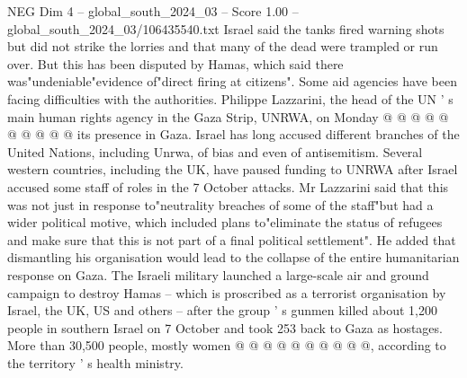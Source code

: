 \begin{textsample}{NEG Dim 4 – global\_south\_2024\_03 – Score 1.00 – global\_south\_2024\_03/106435540.txt}
Israel said the tanks fired warning shots but did not strike the lorries and that many of the dead were trampled or run over.
But this has been disputed by Hamas, which said there was"undeniable"evidence of"direct firing at citizens".
Some aid agencies have been facing difficulties with the authorities.
Philippe Lazzarini, the head of the UN ' s main human rights agency in the Gaza Strip, UNRWA, on Monday @ @ @ @ @ @ @ @ @ @ its presence in Gaza.
Israel has long accused different branches of the United Nations, including Unrwa, of bias and even of antisemitism.
Several western countries, including the UK, have paused funding to UNRWA after Israel accused some staff of roles in the 7 October attacks.
Mr Lazzarini said that this was not just in response to"neutrality breaches of some of the staff"but had a wider political motive, which included plans to"eliminate the status of refugees and make sure that this is not part of a final political settlement".
He added that dismantling his organisation would lead to the collapse of the entire humanitarian response on Gaza.
The Israeli military launched a large-scale air and ground campaign to destroy Hamas -- which is proscribed as a terrorist organisation by Israel, the UK, US and others -- after the group ' s gunmen killed about 1,200 people in southern Israel on 7 October and took 253 back to Gaza as hostages.
More than 30,500 people, mostly women @ @ @ @ @ @ @ @ @ @, according to the territory ' s health ministry.

\end{textsample}
